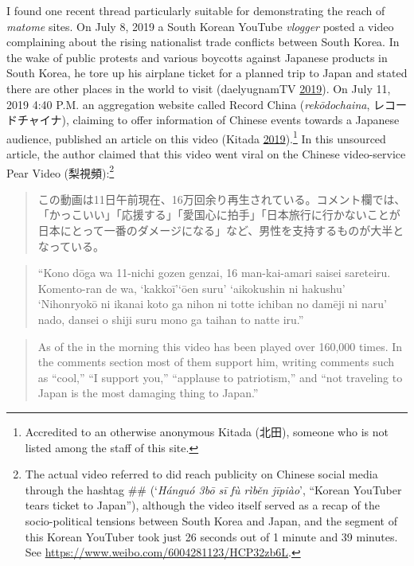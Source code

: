 \documentclass[10pt,british,A4paper,,openany]{memoir}
\begin{document}
I found one recent thread particularly suitable for demonstrating the
reach of \emph{matome} sites. On July 8, 2019 a South Korean YouTube
\emph{vlogger} posted a video complaining about the rising nationalist
trade conflicts between South Korea. In the wake of public protests and
various boycotts against Japanese products in South Korea, he tore up
his airplane ticket for a planned trip to Japan and stated there are
other places in the world to visit (daelyugnamTV
\protect\hyperlink{ref-daelyugnamtv_eng._2019}{2019}). On July 11, 2019
4:40 P.M. an aggregation website called Record China
(\emph{rekōdochaina}, レコードチャイナ), claiming to offer information
of Chinese events towards a Japanese audience, published an article on
this video (Kitada
\protect\hyperlink{ref-kitada_eng._2019}{2019}).\footnote{Accredited to
  an otherwise anonymous Kitada (北田), someone who is not listed among
  the staff of this site.} In this unsourced article, the author claimed
that this video went viral on the Chinese video-service Pear Video
(梨視頻):\footnote{The actual video referred to did reach publicity on
  Chinese social media through the hashtag
  \#\# (`\emph{Hánguó \zhu3bō 
  sī fù rìběn jīpiào}', ``Korean YouTuber tears ticket to Japan''),
  although the video itself served as a recap of the socio-political
  tensions between South Korea and Japan, and the segment of this Korean
  YouTuber took just 26 seconds out of 1 minute and 39 minutes. See
  \url{https://www.weibo.com/6004281123/HCP32zb6L}.}

\begin{quote}
この動画は11日午前現在、16万回余り再生されている。コメント欄では、「かっこいい」「応援する」「愛国心に拍手」「日本旅行に行かないことが日本にとって一番のダメージになる」など、男性を支持するものが大半となっている。
\end{quote}

\begin{quote}
``Kono dōga wa 11-nichi gozen genzai, 16 man-kai-amari saisei sareteiru.
Komento-ran de wa, `kakkoī'`ōen suru' `aikokushin ni hakushu'
`Nihonryokō ni ikanai koto ga nihon ni totte ichiban no damēji ni naru'
nado, dansei o shiji suru mono ga taihan to natte iru.''
\end{quote}

\begin{quote}
As of the  in the morning this video has been played over
160,000 times. In the comments section most of them support him, writing
comments such as ``cool,'' ``I support you,'' ``applause to
patriotism,'' and ``not traveling to Japan is the most damaging thing to
Japan.''
\end{quote}
\end{document}
